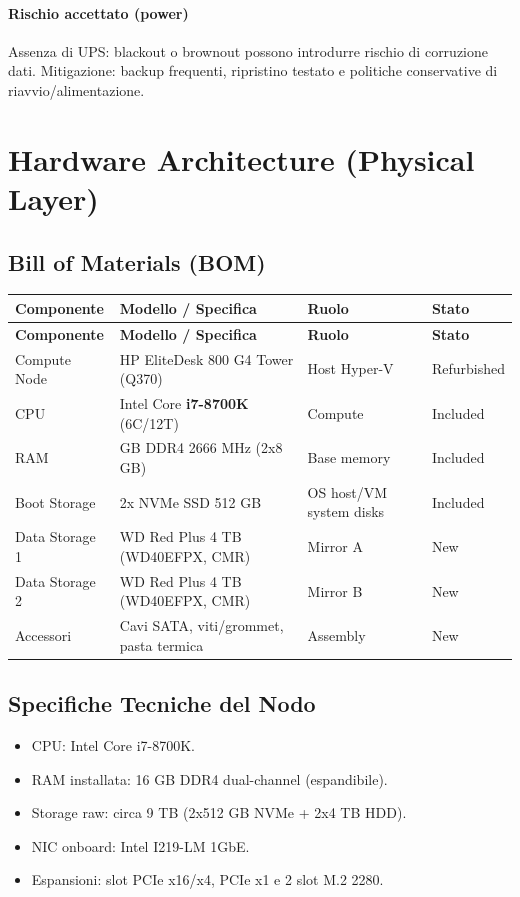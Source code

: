 \documentclass[11pt,a4paper]{article}
\begin{document}
\paragraph{Rischio accettato (power)}
Assenza di UPS: blackout o brownout possono introdurre rischio di corruzione dati. Mitigazione: backup frequenti, ripristino testato e politiche conservative di riavvio/alimentazione.

\section{Hardware Architecture (Physical Layer)}

\subsection{Bill of Materials (BOM)}
\begin{longtable}{>{\raggedright\arraybackslash}p{} >{\raggedright\arraybackslash}p{} >{\raggedright\arraybackslash}p{} >{\raggedright\arraybackslash}p{}}
\toprule
\textbf{Componente} & \textbf{Modello / Specifica} & \textbf{Ruolo} & \textbf{Stato} \\
\midrule
\endfirsthead
\toprule
\textbf{Componente} & \textbf{Modello / Specifica} & \textbf{Ruolo} & \textbf{Stato} \\
\midrule
\endhead
Compute Node & HP EliteDesk 800 G4 Tower (Q370) & Host Hyper-V & Refurbished \\
CPU & Intel Core \textbf{i7-8700K} (6C/12T) & Compute & Included \\
RAM & 16 GB DDR4 2666 MHz (2x8 GB) & Base memory & Included \\
Boot Storage & 2x NVMe SSD 512 GB & OS host/VM system disks & Included \\
Data Storage 1 & WD Red Plus 4 TB (WD40EFPX, CMR) & Mirror A & New \\
Data Storage 2 & WD Red Plus 4 TB (WD40EFPX, CMR) & Mirror B & New \\
Accessori & Cavi SATA, viti/grommet, pasta termica & Assembly & New \\
\bottomrule
\end{longtable}

\subsection{Specifiche Tecniche del Nodo}
\begin{itemize}
  \item CPU: Intel Core i7-8700K.
  \item RAM installata: 16 GB DDR4 dual-channel (espandibile).
  \item Storage raw: circa 9 TB (2x512 GB NVMe + 2x4 TB HDD).
  \item NIC onboard: Intel I219-LM 1GbE.
  \item Espansioni: slot PCIe x16/x4, PCIe x1 e 2 slot M.2 2280.
\end{itemize}
\end{document}
